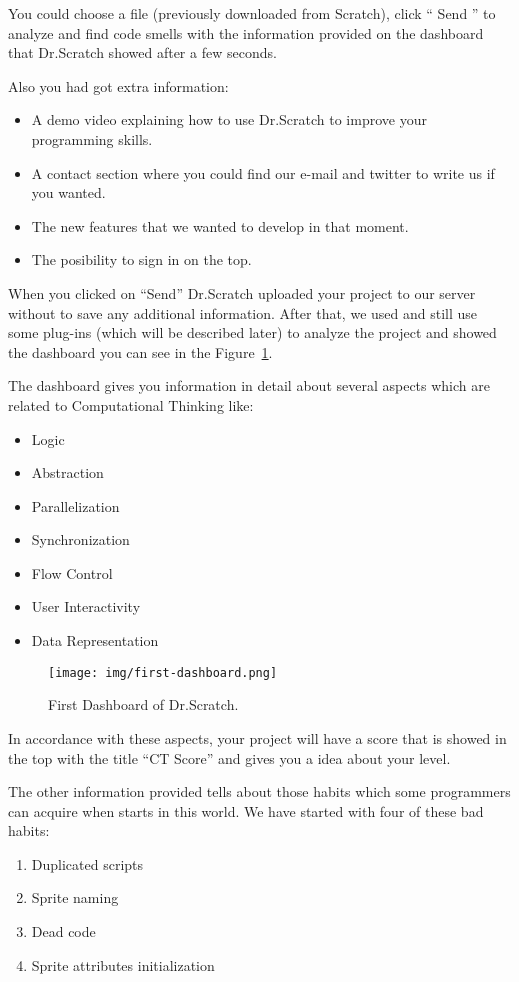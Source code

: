 \documentclass[a4paper, 12pt]{book}
\begin{document}
You could choose a file (previously downloaded from Scratch), click
`` Send '' to analyze and find code smells with the information 
provided on the dashboard that Dr.Scratch showed  after a few seconds.
   

Also you had got extra information:
\setlength{\parskip}{2mm}
\begin{itemize}

   	\item A demo video explaining how to use Dr.Scratch to improve your 
   	programming skills.
   	\item A contact section where you could find our e-mail and twitter to write
   	us if you wanted.
	\item The new features that we wanted to develop in that moment.
	\item The posibility to sign in on the top.
\end{itemize}
\setlength{\parskip}{8mm}
When you clicked on ``Send'' Dr.Scratch uploaded your project to our server
without to save any additional information. After that, we used and
still use some plug-ins (which will be described later) to analyze the 
project and showed the dashboard you can see in the 
Figure~\ref{figure:first-dashboard}.

The dashboard gives you information in detail about several aspects which are
related to Computational Thinking like: 
\setlength{\parskip}{0mm}
\begin{itemize}
  	\setlength{\parskip}{0mm}
   	\item Logic
   	\item Abstraction
	\item Parallelization
	\item Synchronization
	\item Flow Control
	\item User Interactivity
	\item Data Representation
\end{itemize}

\begin{figure}
   	\centering
   	\texttt{[image: img/first-dashboard.png]}
   	\caption{First Dashboard of Dr.Scratch.}
   	\label{figure:first-dashboard}
\end{figure}

In accordance with these aspects, your project will have a score that is showed
in the top with the title ``CT Score'' and gives you a idea about your level.

The other information provided tells about those habits which some programmers
can acquire when starts in this world. We have started with four of these bad
habits:
\setlength{\parskip}{0mm}
\begin{enumerate}
  	\setlength{\parskip}{0mm}
   	\item Duplicated scripts
   	\item Sprite naming
	\item Dead code
	\item Sprite attributes initialization
\end{enumerate}
\end{document}
